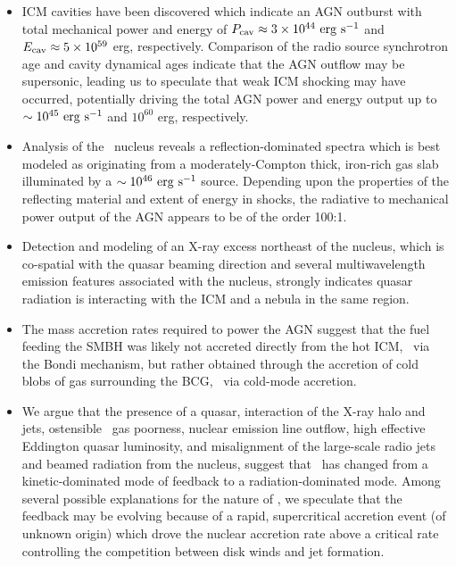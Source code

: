\documentclass[useAMS,usenatbib]{mn2e}
\begin{document}
\begin{itemize}
\item ICM cavities have been discovered which indicate an AGN outburst
  with total mechanical power and energy of $P_{\rm{cav}} \approx 3 \times
  10^{44} ~\rm{\mbox{\ensuremath{\rm{erg}}}~\ensuremath{\rm{\mbox{\ensuremath{\rm{s}}}^{-1}}}}$ and $E_{\rm{cav}} \approx 5 \times 10^{59}$ erg,
  respectively. Comparison of the radio source synchrotron age and
  cavity dynamical ages indicate that the AGN outflow may be
  supersonic, leading us to speculate that weak ICM shocking may have
  occurred, potentially driving the total AGN power and energy output
  up to $\sim 10^{45} ~\rm{\mbox{\ensuremath{\rm{erg}}}~\ensuremath{\rm{\mbox{\ensuremath{\rm{s}}}^{-1}}}}$ and $10^{60}$ erg, respectively.
\item Analysis of the \irs\ nucleus reveals a reflection-dominated
  spectra which is best modeled as originating from a
  moderately-Compton thick, iron-rich gas slab illuminated by a $\sim
  10^{46} ~\rm{\mbox{\ensuremath{\rm{erg}}}~\ensuremath{\rm{\mbox{\ensuremath{\rm{s}}}^{-1}}}}$ source. Depending upon the properties of the
  reflecting material and extent of energy in shocks, the radiative to
  mechanical power output of the AGN appears to be of the order 100:1.
\item Detection and modeling of an X-ray excess northeast of the
  nucleus, which is co-spatial with the quasar beaming direction and
  several multiwavelength emission features associated with the
  nucleus, strongly indicates quasar radiation is interacting with the
  ICM and a nebula in the same region.
\item The mass accretion rates required to power the AGN suggest that
  the fuel feeding the SMBH was likely not accreted directly from the
  hot ICM, \ie\ via the Bondi mechanism, but rather obtained through
  the accretion of cold blobs of gas surrounding the BCG, \ie\ via
  cold-mode accretion.
\item We argue that the presence of a quasar, interaction of the X-ray
  halo and jets, ostensible \irs\ gas poorness, nuclear emission line
  outflow, high effective Eddington quasar luminosity, and
  misalignment of the large-scale radio jets and beamed radiation from
  the nucleus, suggest that \irs\ has changed from a kinetic-dominated
  mode of feedback to a radiation-dominated mode. Among several
  possible explanations for the nature of \irs, we speculate that the
  feedback may be evolving because of a rapid, supercritical accretion
  event (of unknown origin) which drove the nuclear accretion rate
  above a critical rate controlling the competition between disk winds
  and jet formation.
\end{itemize}

\end{document}
